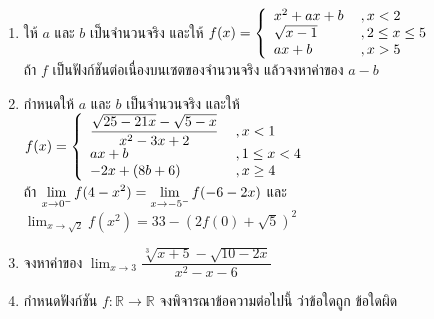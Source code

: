 \documentclass[hidelinks,12pt,a4paper]{article}
\makeatletter
\newcommand{\s}{\space}
\newcommand{\nr}[2]{\sqrt[#1]{#2}}
\newcommand{\Jitem}{%
  \refstepcounter{\@enumctr}%
  \item[%
    {\raisebox{-0ex}[0pt][0pt]{$\boldsymbol{\textcolor{magenta}{\mathbf{J}}^{\color{blue}{p}}}$}}%
    \,%
    \@nameuse{label\@enumctr}]%
}
\makeatother
\begin{document}
\begin{enumerate}
    \renewcommand{\labelenumii}{\arabic{enumii})}
    \item ให้ $a$ และ $b$ เป็นจำนวนจริง และให้
    $f(x) = \left\{ \begin{array}{ll}
        x^2+ax+b & \hspace{0.8mm} ,x<2 \\
        \sqrt{x-1} &  \hspace{0.8mm} ,2\leq x\leq5 \\
        ax+b & \hspace{0.8mm} ,x>5
        \end{array} 
        \right.$ \\%
    ถ้า $f$ เป็นฟังก์ชันต่อเนื่องบนเซตของจำนวนจริง แล้วจงหาค่าของ $a-b$ \s\s [PAT 1 มี.ค. 57]
    \vspace{80mm}
    \item กำหนดให้ $a$ และ $b$ เป็นจำนวนจริง และให้ \s
    $f(x) = \left\{ \begin{array}{ll}
        \dfrac{\sqrt{25-21x}-\sqrt{5-x}}{x^2-3x+2} & \hspace{0.8mm} ,x< 1 \\
        ax+b &  \hspace{0.8mm} ,1\leq x <4 \\
        -2x+(8b+6) & \hspace{0.8mm} ,x\geq 4
        \end{array} 
        \right.$ \\%
    ถ้า \s
    $\displaystyle\lim_{x\to0^{\scalebox{0.6}{$-$}}} f(4-x^2) = \displaystyle\lim_{x\to-5^{\scalebox{0.6}{$-$}}} f(-6-2x)$ \s 
    และ \s
    $\displaystyle\lim_{x\to\sqrt{2}} f(x^2) = 33-\left(2f(0)+\sqrt{5}\right)^2$
    \begin{enumerate}
    \end{enumerate}
    \newpage
    \Jitem จงหาค่าของ \s $\displaystyle\lim_{x\to3} \dfrac{\nr{3}{x+5}-\sqrt{10-2x}}{x^2-x-6}$
    \vspace{100mm}
    \item กำหนดฟังก์ชัน \s $f:\mathbb{R}\rightarrow\mathbb{R}$ \s จงพิจารณาข้อความต่อไปนี้ ว่าข้อใดถูก ข้อใดผิด

\end{enumerate}
\end{document}
